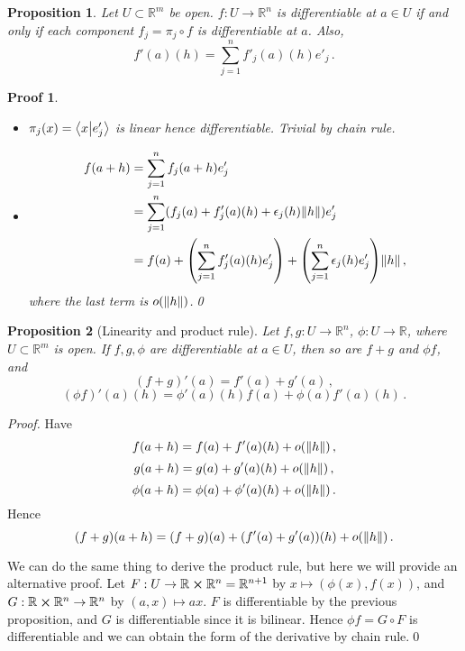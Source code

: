 \documentclass{article}
\theoremstyle{plain}\theoremheaderfont{\normalfont\itshape}\theorembodyfont{\rmfamily}\theoremseparator{.}\newtheorem*{rem}{Remark}\newtheorem*{ex}{Example}\newtheorem*{proof}{Proof}\newtheorem*{altp}{Alternative proof}
\theoremstyle{plain}\theoremheaderfont{\normalfont\bfseries}\theorembodyfont{\rmfamily}\theoremseparator{.}\newtheorem{thm}{Theorem}[section]\newtheorem{lem}[thm]{Lemma}\newtheorem{prop}[thm]{Proposition}\newtheorem*{cor}{Corollary}\newtheorem{defn}[thm]{Definition}\newtheorem{clm}[thm]{Claim}\newtheorem{clminproof}{Claim}
\theoremstyle{break}\theoremheaderfont{\normalfont\itshape}\theorembodyfont{\rmfamily}\theoremseparator{.\medskip}\newtheorem*{proofskip}{Proof}\newtheorem*{exs}{Examples}\newtheorem*{rems}{Remarks}
\theoremstyle{break}\theoremheaderfont{\normalfont\bfseries}\theorembodyfont{\rmfamily}\theoremseparator{.\medskip}\newtheorem{lemskip}[thm]{Lemma}\newtheorem{defnskip}[thm]{Definition}\newtheorem{propskip}[thm]{Proposition}\newtheorem{thmskip}[thm]{Theorem}
\newcommand{\qed}{\hfill\ensuremath{\Box}}
\begin{document}
    \begin{prop}
        Let \(U\subset\mathbb{R}^m\) be open. \(f:U\to\mathbb{R}^n\) is differentiable at \(a\in U\) if and only if each component \(f_j=\pi_j\circ f\) is differentiable at \(a\). Also,
        \[f'(a)(h)=\sum_{j=1}^{n}f'_j(a)(h)e'_j\,.\]
    \end{prop}
    \begin{proofskip}
        \begin{itemize}
            \item[(\(\Rightarrow\))] \(\pi_j(x)=\braket{x}{e'_j}\) is linear hence differentiable. Trivial by chain rule.
            \item[(\(\Leftarrow\))]
            \begin{align*}
                f(a+h)&=\sum_{j=1}^{n}f_j(a+h)e'_j\\
                &=\sum_{j=1}^{n}(f_j(a)+f_j'(a)(h)+\epsilon_j(h)\norm{h})e'_j\\
                &=f(a)+\qty(\sum_{j=1}^{n}f'_j(a)(h)e'_j)+\qty(\sum_{j=1}^{n}\epsilon_j(h)e'_j)\norm{h}\,,
            \end{align*}
            where the last term is \(o(\norm{h})\).\qed
        \end{itemize}
    \end{proofskip}
    \begin{prop}[Linearity and product rule]
        Let \(f,g:U\to\mathbb{R}^n\), \(\phi:U\to\mathbb{R}\), where \(U\subset\mathbb{R}^m\) is open. If \(f,g,\phi\) are differentiable at \(a\in U\), then so are \(f+g\) and \(\phi f\), and
        \[(f+g)'(a)=f'(a)+g'(a)\,,\]
        \[(\phi f)'(a)(h)=\phi'(a)(h)f(a)+\phi(a)f'(a)(h)\,.\]
    \end{prop}
    \begin{proof}
        Have
        \[f(a+h)=f(a)+f'(a)(h)+o(\norm{h})\,,\]
        \[g(a+h)=g(a)+g'(a)(h)+o(\norm{h})\,,\]
        \[\phi(a+h)=\phi(a)+\phi'(a)(h)+o(\norm{h})\,.\]
        Hence
        \[(f+g)(a+h)=(f+g)(a)+(f'(a)+g'(a))(h)+o(\norm{h})\,.\]

        We can do the same thing to derive the product rule, but here we will provide an alternative proof. Let \(F:U\to\mathbb{R}\cross\mathbb{R}^n=\mathbb{R}^{n+1}\) by \(x\mapsto(\phi(x),f(x))\), and \(G:\mathbb{R}\cross\mathbb{R}^n\to\mathbb{R}^n\) by \((a,x)\mapsto ax\). \(F\) is differentiable by the previous proposition, and \(G\) is differentiable since it is bilinear. Hence \(\phi f=G\circ F\) is differentiable and we can obtain the form of the derivative by chain rule.\qed
    \end{proof}
    
\end{document}
